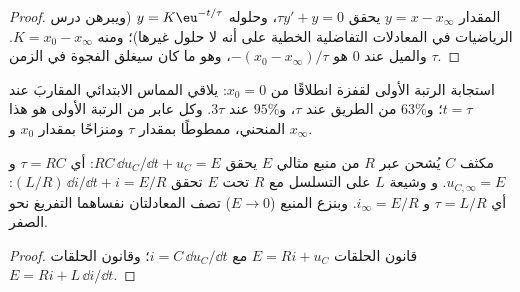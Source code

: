\begin{proof}
المقدار $y = x - x_\infty$ يحقق $\tau y' + y = 0$، وحلوله
$y = K\eu^{-t/\tau}$ (ويبرهن درس الرياضيات في المعادلات التفاضلية
الخطية على أنه لا حلول غيرها)؛ ومنه $K = x_0 - x_\infty$. والميل
عند $0$ هو $-(x_0 - x_\infty)/\tau$، وهو ما كان سيغلق الفجوة في الزمن
$\tau$.
\end{proof}

\begin{omfigure}

{\small استجابة الرتبة الأولى لقفزة انطلاقًا من $x_0 = 0$: يلاقي المماس
الابتدائي المقاربَ عند $t = \tau$؛ و$63\%$ من الطريق عند $\tau$،
و$95\%$ عند $3\tau$. وكل عابر من الرتبة الأولى هو هذا المنحني، ممطوطًا
بمقدار $\tau$ ومنزاحًا بمقدار $x_0$ و $x_\infty$.}
\end{omfigure}

\begin{proposition}[الدارتان RC و RL]\label{prop:b1:transient-regimes:rcrl}
مكثف $C$ يُشحن عبر  $R$ من منبع مثالي $E$
يحقق $RC\,\dd u_C/\dd t + u_C = E$: أي $\tau = RC$ و $u_{C,\infty} = E$. و
وشيعة $L$ على التسلسل مع $R$ تحت $E$ تحقق $(L/R)\,\dd i/\dd t + i =
E/R$: أي $\tau = L/R$ و $i_\infty = E/R$. وبنزع المنبع
($E \to 0$) تصف المعادلتان نفساهما التفريغ نحو الصفر.
\end{proposition}

\begin{proof}
قانون الحلقات $E = Ri + u_C$ مع $i = C\,\dd u_C/\dd t$؛ وقانون الحلقات
$E = Ri + L\,\dd i/\dd t$.
\end{proof}

